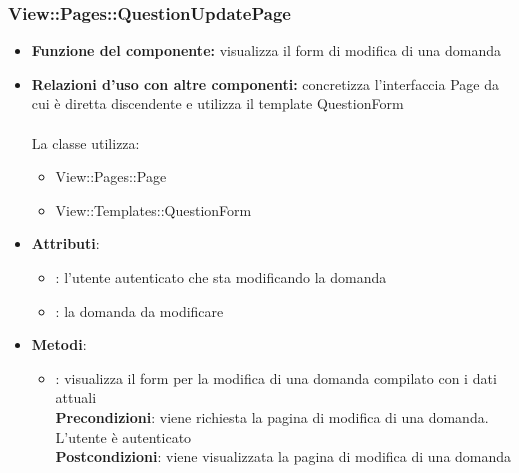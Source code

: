 \subsubsection{View::Pages::QuestionUpdatePage}
\begin{itemize}
\item\textbf{Funzione del componente:} visualizza il form di modifica di una domanda
				\item\textbf{Relazioni d'uso con altre componenti:} concretizza l'interfaccia Page da cui è diretta discendente e utilizza il template QuestionForm\\ \\
La classe utilizza:
	\begin{itemize}
		\item View::Pages::Page\\
		\item View::Templates::QuestionForm\\
	\end{itemize}
\item\textbf{Attributi}:
	\begin{itemize}
		\item{}: l'utente autenticato che sta modificando la domanda\\
		\item{}: la domanda da modificare\\
	\end{itemize}
\item\textbf{Metodi}:
	\begin{itemize}
		\item{}: visualizza il form per la modifica di una domanda compilato con i dati attuali\\
		\textbf{Precondizioni}: viene richiesta la pagina di modifica di una domanda. L'utente è autenticato\\
		\textbf{Postcondizioni}: viene visualizzata la pagina di modifica di una domanda\\
	\end{itemize}
\end{itemize}

